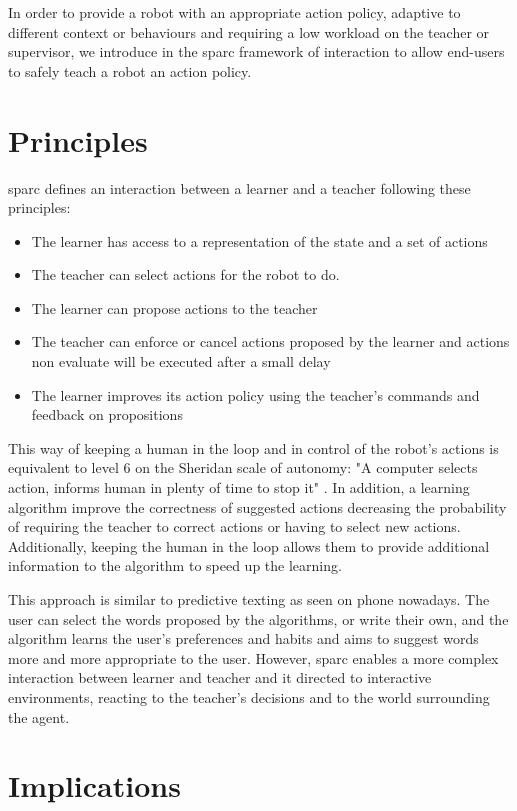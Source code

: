 In order to provide a robot with an appropriate action policy, adaptive to different context or behaviours and requiring a low workload on the teacher or supervisor, we introduce in \cite{senft2015sparc} the \acrfull{sparc} framework of interaction to allow end-users to safely teach a robot an action policy.

\section{Principles}

\gls{sparc} defines an interaction between a learner and a teacher following these principles:
\begin{itemize}
	\item The learner has access to a representation of the state and a set of actions
	\item The teacher can select actions for the robot to do.
	\item The learner can propose actions to the teacher
	\item The teacher can enforce or cancel actions proposed by the learner and actions non evaluate will be executed after a small delay
	\item The learner improves its action policy using the teacher's commands and feedback on propositions
\end{itemize} 

This way of keeping a human in the loop and in control of the robot's actions is equivalent to level 6 on the Sheridan scale of autonomy: "A computer selects action, informs human in plenty of time to stop it" \citep{sheridan1978human}. In addition, a learning algorithm improve the correctness of suggested actions decreasing the probability of requiring the teacher to correct actions or having to select new actions. Additionally, keeping the human in the loop allows them to provide additional information to the algorithm to speed up the learning.

This approach is similar to predictive texting as seen on phone nowadays. The user can select the words proposed by the algorithms, or write their own, and the algorithm learns the user's preferences and habits and aims to suggest words more and more appropriate to the user. However, \gls{sparc} enables a more complex interaction between learner and teacher and it directed to interactive environments, reacting to the teacher's decisions and to the world surrounding the agent.
    
\section{Implications}


